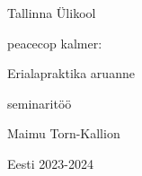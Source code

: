 \begin{titlepage}
\par{Tallinna Ülikool}
\vspace{0.3\textheight}
\par{peacecop kalmer:}
\LARGE
\par{Erialapraktika aruanne}
\normalsize
\par{seminaritöö}
\vspace{0.3\textheight}
\begin{flushright}
\par{Maimu Torn-Kallion}
\end{flushright}
\vfill
Eesti
\hfill
2023-2024
\end{titlepage}
